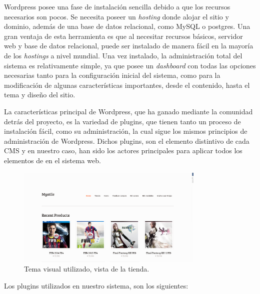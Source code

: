 Wordpress posee una fase de instalación sencilla debido a que los recursos
necesarios son pocos. Se necesita poseer un \emph{hosting} donde alojar el sitio y
dominio, además de una base de datos relacional, como MySQL o postgres.
Una gran ventaja de esta herramienta es que al necesitar recursos básicos,
servidor web y base de datos relacional, puede ser instalado de manera fácil en la
mayoría de los \emph{hostings} a nivel mundial.
Una vez instalado, la administración total del sistema es relativamente simple,
ya que posee un \emph{dashboard} con todas las opciones necesarias
tanto para la configuración inicial del sistema, como para la modificación
de algunas características importantes, desde el contenido, hasta el tema
y diseño del sitio.

La características principal de Wordpress, que ha ganado mediante
la comunidad detrás del proyecto, es la variedad de plugins, que
tienen tanto un proceso de instalación fácil, como su administración,
la cual sigue los mismos principios de administración de Wordpress.
Dichos plugins, son el elemento distintivo de cada CMS
y en nuestro caso, han sido los actores principales para aplicar
todos los elementos de {\GAM} en el sistema web.

\begin{figure}[!htb]
  \centering
  \includegraphics[width=0.8\textwidth]{images/SitioBase.png}
  \caption[TemaVisual]{Tema visual utilizado, vista de la tienda.}
  \label{fig:Players}
\end{figure}



Los plugins utilizados en nuestro sistema, son los siguientes:

